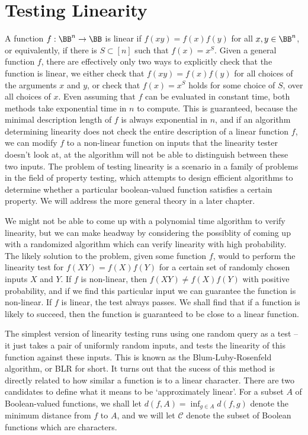 \section{Testing Linearity}

A function $f: \BB^n \to \BB$ is linear if $f(xy) = f(x) f(y)$ for all $x,y \in \BB^n$, or equivalently, if there is $S \subset [n]$ such that $f(x) = x^S$. Given a general function $f$, there are effectively only two ways to explicitly check that the function is linear, we either check that $f(xy) = f(x) f(y)$ for all choices of the arguments $x$ and $y$, or check that $f(x) = x^S$ holds for some choice of $S$, over all choices of $x$. Even assuming that $f$ can be evaluated in constant time, both methods take exponential time in $n$ to compute. This is guaranteed, because the minimal description length of $f$ is always exponential in $n$, and if an algorithm determining linearity does not check the entire description of a linear function $f$, we can modify $f$ to a non-linear function on inputs that the linearity tester doesn't look at, at the algorithm will not be able to distinguish between these two inputs. The problem of testing linearity is a scenario in a family of problems in the field of property testing, which attempts to design efficient algorithms to determine whether a particular boolean-valued function satisfies a certain property. We will address the more general theory in a later chapter.

We might not be able to come up with a polynomial time algorithm to verify linearity, but we can make headway by considering the possiblity of coming up with a randomized algorithm which can verify linearity with high probability. The likely solution to the problem, given some function $f$, would to perform the linearity test for $f(XY) = f(X) f(Y)$ for a certain set of randomly chosen inputs $X$ and $Y$. If $f$ is non-linear, then $f(XY) \neq f(X) f(Y)$ with positive probability, and if we find this particular input we can guarantee the function is non-linear. If $f$ is linear, the test always passes. We shall find that if a function is likely to succeed, then the function is guaranteed to be close to a linear function.

The simplest version of linearity testing runs using one random query as a test -- it just takes a pair of uniformly random inputs, and tests the linearity of this function against these inputs. This is known as the Blum-Luby-Rosenfeld algorithm, or BLR for short. It turns out that the sucess of this method is directly related to how similar a function is to a linear character. There are two candidates to define what it means to be `approximately linear'. For a subset $A$ of Boolean-valued functions, we shall let $d(f,A) = \inf_{g \in A} d(f,g)$ denote the minimum distance from $f$ to $A$, and we will let $\mathcal{C}$ denote the subset of Boolean functions which are characters.

